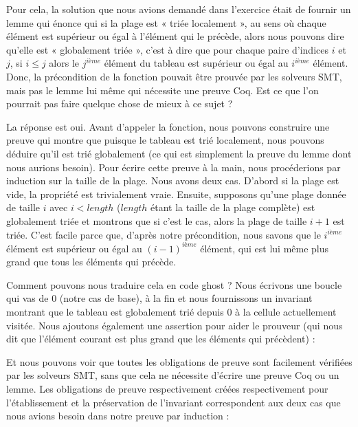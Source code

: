 

Pour cela, la solution que nous avions demandé dans l'exercice était de fournir
un lemme qui énonce qui si la plage est « triée localement », au sens où chaque
élément est supérieur ou égal à l'élément qui le précède, alors nous pouvons
dire qu'elle est « globalement triée », c'est à dire que pour chaque paire
d'indices $i$ et $j$, si $i \leq j$ alors le $j^{ième}$ élément du tableau est
supérieur ou égal au $i^{ième}$ élément. Donc, la précondition de la fonction
pouvait être prouvée par les solveurs SMT, mais pas le lemme lui même qui
nécessite une preuve Coq. Est ce que l'on pourrait pas faire quelque chose de
mieux à ce sujet ?


La réponse est oui. Avant d'appeler la fonction, nous pouvons construire une
preuve qui montre que puisque le tableau est trié localement, nous pouvons
déduire qu'il est trié globalement (ce qui est simplement la preuve du lemme
dont nous aurions besoin). Pour écrire cette preuve à la main, nous procéderions
par induction sur la taille de la plage. Nous avons deux cas. D'abord si la
plage est vide, la propriété est trivialement vraie. Ensuite, supposons qu'une 
plage donnée de taille $i$ avec $i < length$ ($length$ étant la taille de la 
plage complète) est globalement triée et montrons que si c'est le cas, alors la
plage de taille $i+1$ est triée. C'est facile parce que, d'après notre
précondition, nous savons que le $i^{ième}$ élément est supérieur ou égal au
$(i-1)^{ième}$ élément, qui est lui même plus grand que tous les éléments qui
précède.


Comment pouvons nous traduire cela en code ghost ? Nous écrivons une boucle qui
vas de $0$ (notre cas de base), à la fin  et nous fournissons
un invariant montrant que le tableau est globalement trié depuis $0$ à la cellule
actuellement visitée. Nous ajoutons également une assertion pour aider le
prouveur (qui nous dit que l'élément courant est plus grand que les éléments qui
précèdent) :






Et nous pouvons voir que toutes les obligations de preuve sont facilement
vérifiées par les solveurs SMT, sans que cela ne nécessite d'écrire une preuve Coq
ou un lemme. Les obligations de preuve respectivement créées respectivement pour
l'établissement et la préservation de l'invariant correspondent aux deux cas que
nous avions besoin dans notre preuve par induction :


